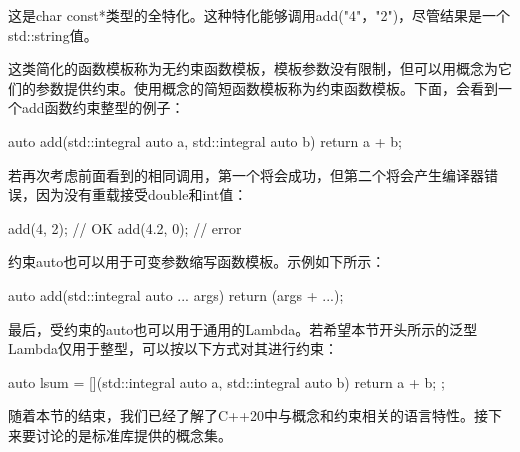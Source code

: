 这是char const*类型的全特化。这种特化能够调用add("4"，"2")，尽管结果是一个std::string值。

这类简化的函数模板称为无约束函数模板，模板参数没有限制，但可以用概念为它们的参数提供约束。使用概念的简短函数模板称为约束函数模板。下面，会看到一个add函数约束整型的例子：

\begin{cppcode}
auto add(std::integral auto a, std::integral auto b)
{
	return a + b;
}
\end{cppcode}

若再次考虑前面看到的相同调用，第一个将会成功，但第二个将会产生编译器错误，因为没有重载接受double和int值：

\begin{cppcode}
add(4, 2); // OK
add(4.2, 0); // error
\end{cppcode}

约束auto也可以用于可变参数缩写函数模板。示例如下所示：

\begin{cppcode}
auto add(std::integral auto ... args)
{
	return (args + ...);
}
\end{cppcode}

最后，受约束的auto也可以用于通用的Lambda。若希望本节开头所示的泛型Lambda仅用于整型，可以按以下方式对其进行约束：

\begin{cppcode}
auto lsum = [](std::integral auto a, std::integral auto b)
{
	return a + b;
};
\end{cppcode}

随着本节的结束，我们已经了解了C++20中与概念和约束相关的语言特性。接下来要讨论的是标准库提供的概念集。






























